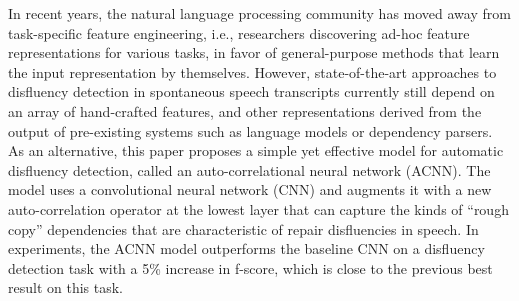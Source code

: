 In recent years, the natural language processing community has moved away from task-specific feature engineering, i.e., researchers discovering ad-hoc feature representations for various tasks, in favor of general-purpose methods that learn the input representation by themselves. However, state-of-the-art approaches to disfluency detection in spontaneous speech transcripts currently still depend on an array of hand-crafted features, and other representations derived from the output of pre-existing systems such as language models or dependency parsers. As an alternative, this paper proposes a simple yet effective model for automatic disfluency detection, called an auto-correlational neural network (ACNN). The model uses a convolutional neural network (CNN) and augments it with a new auto-correlation operator at the lowest layer that can capture the kinds of ``rough copy'' dependencies that are characteristic of repair disfluencies in speech. In experiments, the ACNN model outperforms the baseline CNN on a disfluency detection task with a 5\% increase in f-score, which is close to the previous best result on this task.
